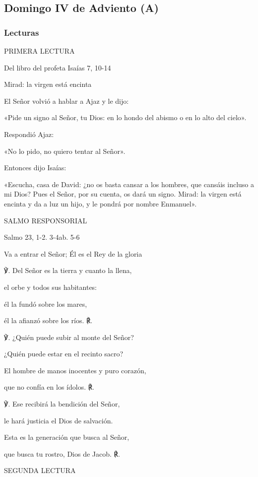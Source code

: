 \documentclass[]{article}
\begin{document}
\subsection{Domingo IV de Adviento (A)}\label{domingo-iv-de-adviento-a}

\subsubsection{Lecturas}\label{lecturas-3}

PRIMERA LECTURA

Del libro del profeta Isaías 7, 10-14

Mirad: la virgen está encinta

El Señor volvió a hablar a Ajaz y le dijo:

«Pide un signo al Señor, tu Dios: en lo hondo del abismo o en lo alto
del cielo».

Respondió Ajaz:

«No lo pido, no quiero tentar al Señor».

Entonces dijo Isaías:

«Escucha, casa de David: ¿no os basta cansar a los hombres, que cansáis
incluso a mi Dios? Pues el Señor, por su cuenta, os dará un signo.
Mirad: la virgen está encinta y da a luz un hijo, y le pondrá por nombre
Enmanuel».

SALMO RESPONSORIAL

Salmo 23, 1-2. 3-4ab. 5-6

Va a entrar el Señor; Él es el Rey de la gloria

℣. Del Señor es la tierra y cuanto la llena,

el orbe y todos sus habitantes:

él la fundó sobre los mares,

él la afianzó sobre los ríos. ℟.

℣. ¿Quién puede subir al monte del Señor?

¿Quién puede estar en el recinto sacro?

El hombre de manos inocentes y puro corazón,

que no confía en los ídolos. ℟.

℣. Ese recibirá la bendición del Señor,

le hará justicia el Dios de salvación.

Esta es la generación que busca al Señor,

que busca tu rostro, Dios de Jacob. ℟.

SEGUNDA LECTURA
\end{document}
